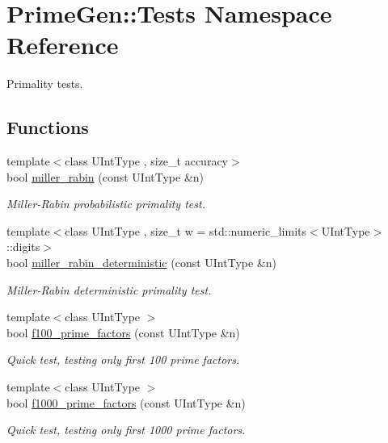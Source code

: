 \hypertarget{namespace_prime_gen_1_1_tests}{\section{Prime\+Gen\+:\+:Tests Namespace Reference}
\label{namespace_prime_gen_1_1_tests}
}


Primality tests.  


\subsection*{Functions}
\begin{DoxyCompactItemize}
\item 
{\footnotesize template$<$class U\+Int\+Type , size\+\_\+t accuracy$>$ }\\bool \hyperlink{namespace_prime_gen_1_1_tests_ab4ab789bde1badebff58de914a31afb3}{miller\+\_\+rabin} (const U\+Int\+Type \&n)
\begin{DoxyCompactList}\small\item\em Miller-\/\+Rabin probabilistic primality test. \end{DoxyCompactList}\item 
{\footnotesize template$<$class U\+Int\+Type , size\+\_\+t w = std\+::numeric\+\_\+limits$<$\+U\+Int\+Type$>$\+::digits$>$ }\\bool \hyperlink{namespace_prime_gen_1_1_tests_a48457a4b0960c5451b655bf9c39aa2b6}{miller\+\_\+rabin\+\_\+deterministic} (const U\+Int\+Type \&n)
\begin{DoxyCompactList}\small\item\em Miller-\/\+Rabin deterministic primality test. \end{DoxyCompactList}\item 
{\footnotesize template$<$class U\+Int\+Type $>$ }\\bool \hyperlink{namespace_prime_gen_1_1_tests_ac7142f51753981c6ae4ca9c87413ab76}{f100\+\_\+prime\+\_\+factors} (const U\+Int\+Type \&n)
\begin{DoxyCompactList}\small\item\em Quick test, testing only first 100 prime factors. \end{DoxyCompactList}\item 
{\footnotesize template$<$class U\+Int\+Type $>$ }\\bool \hyperlink{namespace_prime_gen_1_1_tests_affb664bd1da7fcf28787172279145d4a}{f1000\+\_\+prime\+\_\+factors} (const U\+Int\+Type \&n)
\begin{DoxyCompactList}\small\item\em Quick test, testing only first 1000 prime factors. \end{DoxyCompactList}\end{DoxyCompactItemize}


